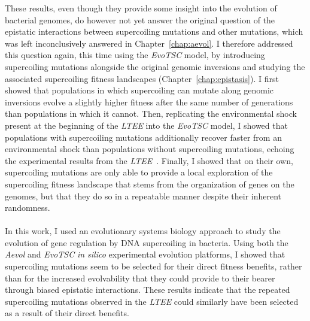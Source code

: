 These results, even though they provide some insight into the evolution of bacterial genomes, do however not yet answer the original question of the epistatic interactions between supercoiling mutations and other mutations, which was left inconclusively answered in Chapter~\ref{chap:aevol}.
I therefore addressed this question again, this time using the \emph{EvoTSC} model, by introducing supercoiling mutations alongside the original genomic inversions and studying the associated supercoiling fitness landscapes (Chapter~\ref{chap:epistasis}).
I first showed that populations in which supercoiling can mutate along genomic inversions evolve a slightly higher fitness after the same number of generations than populations in which it cannot.
Then, replicating the environmental shock present at the beginning of the \emph{LTEE} into the \emph{EvoTSC} model, I showed that populations with supercoiling mutations additionally recover faster from an environmental shock than populations without supercoiling mutations, echoing the experimental results from the \emph{LTEE}~\citep{crozat2010}.
Finally, I showed that on their own, supercoiling mutations are only able to provide a local exploration of the supercoiling fitness landscape that stems from the organization of genes on the genomes, but that they do so in a repeatable manner despite their inherent randomness.

\paragraph{} In this work, I used an evolutionary systems biology approach to study the evolution of gene regulation by DNA supercoiling in bacteria.
Using both the \emph{Aevol} and \emph{EvoTSC} \emph{in silico} experimental evolution platforms, I showed that supercoiling mutations seem to be selected for their direct fitness benefits, rather than for the increased evolvability that they could provide to their bearer through biased epistatic interactions.
These results indicate that the repeated supercoiling mutations observed in the \emph{LTEE} could similarly have been selected as a result of their direct benefits.

